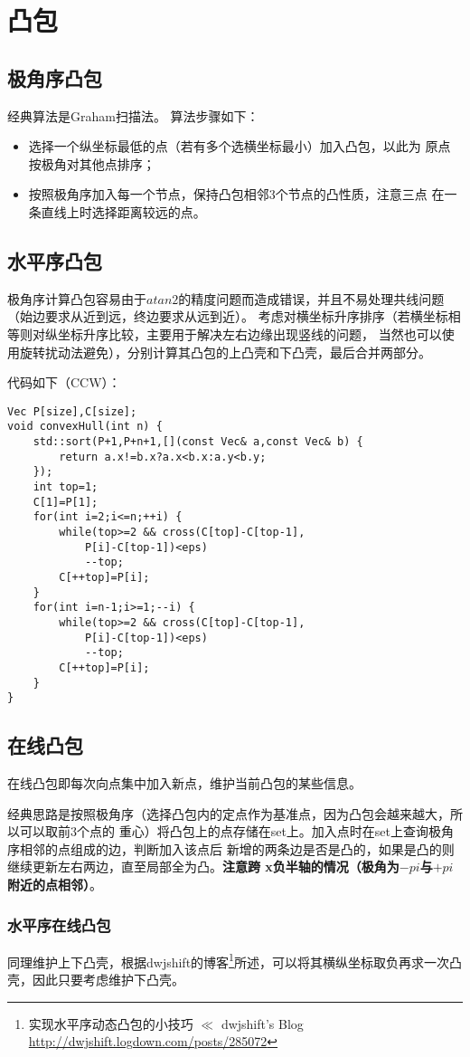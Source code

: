 \section{凸包}
\subsection{极角序凸包}
经典算法是Graham扫描法。
算法步骤如下：
\begin{itemize}
	\item 选择一个纵坐标最低的点（若有多个选横坐标最小）加入凸包，以此为
	      原点按极角对其他点排序；
	\item 按照极角序加入每一个节点，保持凸包相邻3个节点的凸性质，注意三点
	      在一条直线上时选择距离较远的点。
\end{itemize}
\subsection{水平序凸包}
极角序计算凸包容易由于$atan2$的精度问题而造成错误，并且不易处理共线问题
（始边要求从近到远，终边要求从远到近）。
考虑对横坐标升序排序（若横坐标相等则对纵坐标升序比较，主要用于解决左右边缘出现竖线的问题，
当然也可以使用旋转扰动法避免），分别计算其凸包的上凸壳和下凸壳，最后合并两部分。

代码如下（CCW）：
\begin{lstlisting}
Vec P[size],C[size];
void convexHull(int n) {
    std::sort(P+1,P+n+1,[](const Vec& a,const Vec& b) {
        return a.x!=b.x?a.x<b.x:a.y<b.y;
    });
    int top=1;
    C[1]=P[1];
    for(int i=2;i<=n;++i) {
        while(top>=2 && cross(C[top]-C[top-1],
            P[i]-C[top-1])<eps)
            --top;
        C[++top]=P[i];
    }
    for(int i=n-1;i>=1;--i) {
        while(top>=2 && cross(C[top]-C[top-1],
            P[i]-C[top-1])<eps)
            --top;
        C[++top]=P[i];
    }
}
\end{lstlisting}
\subsection{在线凸包}
在线凸包即每次向点集中加入新点，维护当前凸包的某些信息。

经典思路是按照极角序（选择凸包内的定点作为基准点，因为凸包会越来越大，所以可以取前3个点的
重心）将凸包上的点存储在set上。加入点时在set上查询极角序相邻的点组成的边，判断加入该点后
新增的两条边是否是凸的，如果是凸的则继续更新左右两边，直至局部全为凸。{\bfseries 注意跨
x负半轴的情况（极角为$-pi$与$+pi$附近的点相邻）}。
\subsubsection{水平序在线凸包}
同理维护上下凸壳，根据dwjshift的博客\footnote{
	实现水平序动态凸包的小技巧 $\ll$ dwjshift's Blog
	\url{http://dwjshift.logdown.com/posts/285072}
}所述，可以将其横纵坐标取负再求一次凸壳，因此只要考虑维护下凸壳。
